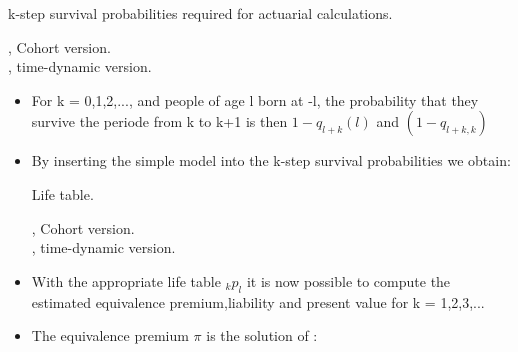 \documentclass{beamer}
\begin{document}
\begin{frame}

\begin{block} {k-step survival probabilities required for actuarial calculations.}

\hspace{5mm}, Cohort version.\\
\hspace{5mm}, time-dynamic version.

\end{block}

\begin{itemize}

\item For k = 0,1,2,..., and people of age l born at -l, the probability that they survive the periode from k to k+1 is then $ 1 - q_{l+k}(l)$ and $ (1 - q_{l+k,k}) $ \\

\item By inserting the simple model into the k-step survival probabilities we obtain:\\

\begin{block} {Life table.}

\hspace{5mm}, Cohort version.\\
\hspace{5mm}, time-dynamic version.

\end{block}

\end{itemize} 

\end{frame}

\begin{frame}

\begin{itemize}
\item With the appropriate life table $_kp_l $ it is now possible to compute the estimated equivalence premium,liability and present value for k = 1,2,3,...

\item The equivalence premium $\pi$ is the solution of : 

\end{itemize}

 \hspace{20mm} 

\end{frame}
\end{document}
